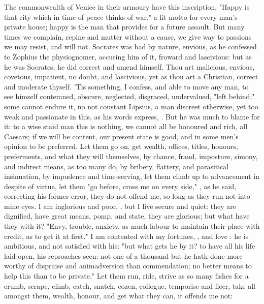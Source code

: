 {The commonwealth of Venice in their armoury have this inscription, "Happy is that city which in time of peace thinks of war," a fit motto for every man's private house; happy is the man that provides for a future assault. But many times we complain, repine and mutter without a cause, we give way to passions we may resist, and will not. Socrates was bad by nature, envious, as he confessed to Zophius the physiognomer, accusing him of it, froward and lascivious: but as he was Socrates, he did correct and amend himself. Thou art malicious, envious, covetous, impatient, no doubt, and lascivious, yet as thou art a Christian, correct and moderate thyself. 'Tis something, I confess, and able to move any man, to see himself contemned, obscure, neglected, disgraced, undervalued, "left behind;" some cannot endure it, no not constant Lipsius, a man discreet otherwise, yet too weak and passionate in this, as his words express, . But he was much to blame for it: to a wise staid man this is nothing, we cannot all be honoured and rich, all Caesars; if we will be content, our present state is good, and in some men's opinion to be preferred. Let them go on, get wealth, offices, titles, honours, preferments, and what they will themselves, by chance, fraud, imposture, simony, and indirect means, as too many do, by bribery, flattery, and parasitical insinuation, by impudence and time-serving, let them climb up to advancement in despite of virtue, let them "go before, cross me on every side," , as he said, correcting his former error, they do not offend me, so long as they run not into mine eyes. I am inglorious and poor, , but I live secure and quiet: they are dignified, have great means, pomp, and state, they are glorious; but what have they with it? "Envy, trouble, anxiety, as much labour to maintain their place with credit, as to get it at first." I am contented with my fortunes, , and love : he is ambitious, and not satisfied with his: "but what gets he by it? to have all his life laid open, his reproaches seen: not one of a thousand but he hath done more worthy of dispraise and animadversion than commendation; no better means to help this than to be private." Let them run, ride, strive as so many fishes for a crumb, scrape, climb, catch, snatch, cozen, collogue, temporise and fleer, take all amongst them, wealth, honour, and get what they can, it offends me not:

}
